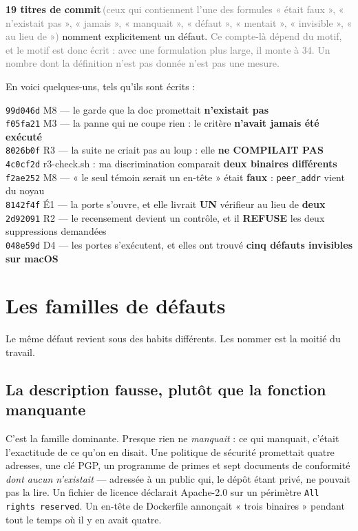 \documentclass[10pt]{report}
\newcommand{\code}[1]{\texttt{\small #1}}
\newcommand{\mesure}[2]{\textbf{#1}\,\footnotesize\textcolor{grey}{(#2)}\normalsize}
\begin{document}
\mesure{19 titres de commit}{ceux qui contiennent l'une des formules « était faux », « n'existait
pas », « jamais », « manquait », « défaut », « mentait », « invisible », « au lieu de »} nomment
explicitement un défaut. \textcolor{grey}{\footnotesize Ce compte-là dépend du motif, et le motif est
donc écrit : avec une formulation plus large, il monte à 34. Un nombre dont la définition n'est pas
donnée n'est pas une mesure.}\normalsize

En voici quelques-uns, tels qu'ils sont écrits :

\begin{extrait}
\footnotesize
\code{99d046d} \quad M8 --- le garde que la doc promettait \textbf{n'existait pas}\\
\code{f05fa21} \quad M3 --- la panne qui ne coupe rien : le critère \textbf{n'avait jamais été exécuté}\\
\code{8026b0f} \quad R3 --- la suite ne criait pas au loup : elle \textbf{ne COMPILAIT PAS}\\
\code{4c0cf2d} \quad r3-check.sh : ma discrimination comparait \textbf{deux binaires différents}\\
\code{f2ae252} \quad M8 --- « le seul témoin serait un en-tête » était \textbf{faux} : \code{peer\_addr} vient du noyau\\
\code{8142f4f} \quad É1 --- la porte s'ouvre, et elle livrait \textbf{UN} vérifieur au lieu de \textbf{deux}\\
\code{2d92091} \quad R2 --- le recensement devient un contrôle, et il \textbf{REFUSE} les deux suppressions demandées\\
\code{048e59d} \quad D4 --- les portes s'exécutent, et elles ont trouvé \textbf{cinq défauts invisibles sur macOS}
\end{extrait}

\section{Les familles de défauts}

Le même défaut revient sous des habits différents. Les nommer est la moitié du travail.

\subsection{La description fausse, plutôt que la fonction manquante}

C'est la famille dominante. Presque rien ne \emph{manquait} : ce qui manquait, c'était l'exactitude
de ce qu'on en disait. Une politique de sécurité promettait quatre adresses, une clé PGP, un programme
de primes et sept documents de conformité \emph{dont aucun n'existait} --- adressée à un public qui,
le dépôt étant privé, ne pouvait pas la lire. Un fichier de licence déclarait Apache-2.0 sur un
périmètre \code{All rights reserved}. Un en-tête de Dockerfile annonçait « trois binaires » pendant
tout le temps où il y en avait quatre.
\end{document}
